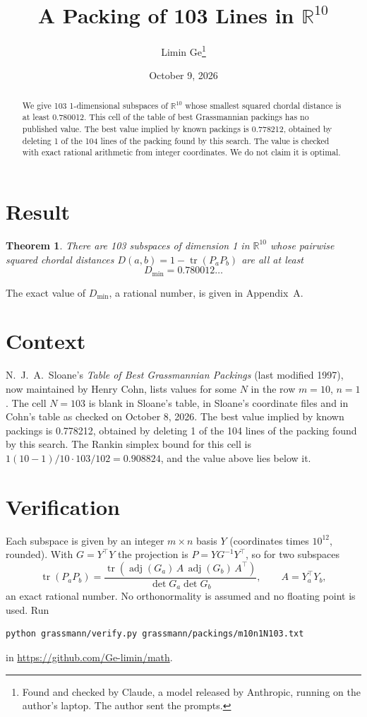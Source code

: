 \documentclass[11pt,a4paper]{article}
\title{A Packing of 103 Lines in $\mathbb{R}^{10}$}
\author{Limin Ge\thanks{Found and checked by Claude, a model released by Anthropic, running on the author's laptop. The author sent the prompts.}}
\date{October 9, 2026}
\newtheorem*{theorem}{Theorem}
\begin{document}
\maketitle
\begin{abstract}
We give 103 1-dimensional subspaces of $\mathbb{R}^{10}$ whose smallest squared chordal distance is at least 0.780012. This cell of the table of best Grassmannian packings has no published value. The best value implied by known packings is 0.778212, obtained by deleting 1 of the 104 lines of the packing found by this search. The value is checked with exact rational arithmetic from integer coordinates. We do not claim it is optimal.
\end{abstract}

\section{Result}
\begin{theorem}
There are 103 subspaces of dimension 1 in $\mathbb{R}^{10}$ whose pairwise squared chordal distances $D(a,b) = 1 - \operatorname{tr}(P_aP_b)$ are all at least
\[ D_{\min} = 0.780012\ldots \]
\end{theorem}
The exact value of $D_{\min}$, a rational number, is given in Appendix~A.


\section{Context}
N.~J.~A.~Sloane's \emph{Table of Best Grassmannian Packings} (last modified 1997), now maintained by Henry Cohn, lists values for some $N$ in the row $m=10$, $n=1$. The cell $N=103$ is blank in Sloane's table, in Sloane's coordinate files and in Cohn's table as checked on October 8, 2026. The best value implied by known packings is 0.778212, obtained by deleting 1 of the 104 lines of the packing found by this search. The Rankin simplex bound for this cell is $1(10-1)/10\cdot 103/102 = 0.908824$, and the value above lies below it.


\section{Verification}
Each subspace is given by an integer $m\times n$ basis $Y$ (coordinates times $10^{12}$, rounded). With $G=Y^\top Y$ the projection is $P=YG^{-1}Y^\top$, so for two subspaces
\[ \operatorname{tr}(P_aP_b)=\frac{\operatorname{tr}(\operatorname{adj}(G_a)\,A\,\operatorname{adj}(G_b)\,A^\top)}{\det G_a\det G_b},\qquad A=Y_a^\top Y_b, \]
an exact rational number. No orthonormality is assumed and no floating point is used. Run
\begin{verbatim}
python grassmann/verify.py grassmann/packings/m10n1N103.txt
\end{verbatim}
in \url{https://github.com/Ge-limin/math}.
\end{document}
